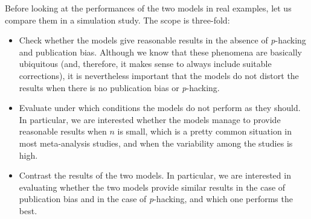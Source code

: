 \documentclass[preprint, authoryear]{elsarticle}
\theoremstyle{plain}
\theoremstyle{definition}
\begin{document}
%
%
Before looking at the performances of the two models in real examples, let us compare them in a simulation study. The scope is three-fold:
\begin{itemize}
\item Check whether the models give reasonable results in the absence of \emph{p}-hacking and publication bias. Although we know that these phenomena are basically ubiquitous (and, therefore, it makes sense to always include suitable corrections), it is nevertheless important that the models do not distort the results when there is no publication bias or \emph{p}-hacking.
\item Evaluate under which conditions the models do not perform as they should. In particular, we are interested whether the models manage to provide reasonable results when $n$ is small, which is a pretty common situation in most meta-analysis studies, and when the variability among the studies is high.
\item Contrast the results of the two models. In particular, we are interested in evaluating whether the two models provide similar results in the case of publication bias and in the case of \emph{p}-hacking, and which one performs the best.
\end{itemize}
\end{document}
